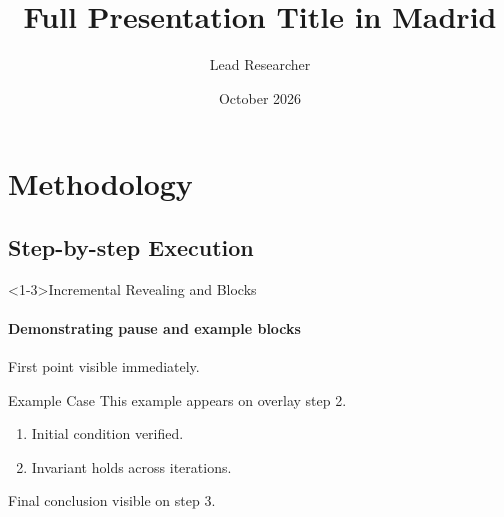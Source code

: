 \documentclass{beamer}
\title[Short Title]{Full Presentation Title in Madrid}
\author[Author]{Lead Researcher}
\institute[Inst]{Research Laboratory}
\date[2026]{October 2026}
\begin{document}
\begin{frame}
  \titlepage
\end{frame}

\section{Methodology}
\subsection{Step-by-step Execution}

\begin{frame}<1-3>{Incremental Revealing and Blocks}
  \framesubtitle{Demonstrating pause and example blocks}
  First point visible immediately.
  \pause

  \begin{exampleblock}{Example Case}
    This example appears on overlay step 2.
    \begin{enumerate}
      \item Initial condition verified.
      \item Invariant holds across iterations.
    \end{enumerate}
  \end{exampleblock}

  \pause
  Final conclusion visible on step 3.
\end{frame}
\end{document}

